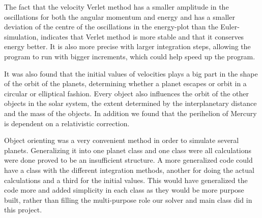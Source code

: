 

The fact that the velocity Verlet method has a smaller amplitude in the oscillations for both the angular momentum and energy and has a smaller deviation of the centre of the oscillations in the energy-plot than the Euler-simulation, indicates that Verlet method is more stable and that it conserves energy better. It is also more precise with larger integration steps, allowing the program to run with bigger increments, which could help speed up the program.

It was also found that the initial values of velocities plays a big part in the shape of the orbit of the planets, determining whether a planet escapes or orbit in a circular or elliptical fashion. Every object also influences the orbit of the other objects in the solar system, the extent determined by the interplanetary distance and the mass of the objects. In addition we found that the perihelion of Mercury is dependent on a relativistic correction.  

Object orienting was a very convenient method in order to simulate several planets. Generalizing it into one planet class and one class were all calculations were done proved to be an insufficient structure. A more generalized code could have a class with the different integration methods,   another for doing the actual calculations and a third for the initial values. This would have generalized the code more and added simplicity in each class as they would be more purpose built, rather than filling the multi-purpose role our solver and main class did in this project. 
